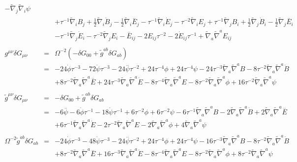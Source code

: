 \documentclass[10pt,letterpaper]{article}
\numberwithin{equation}{section}
\begin{document}
\begin{eqnarray}
-  \tilde{\nabla}_{j}\tilde{\nabla}_{i}\psi
\nonumber\\
&&+\tau^{-1} \tilde{\nabla}_{i}B_{j}
+ \tfrac{1}{2} \tilde{\nabla}_{i}\dot{B}_{j}
-  \tfrac{1}{2} \tilde{\nabla}_{i}\overset{..}{E}_{j}
-  \tau^{-1} \tilde{\nabla}_{i}\dot{E}_{j}
-  \tau^{-2} \tilde{\nabla}_{i}E_{j}
+ \tau^{-1} \tilde{\nabla}_{j}B_{i}
+ \tfrac{1}{2} \tilde{\nabla}_{j}\dot{B}_{i}
-  \tfrac{1}{2} \tilde{\nabla}_{j}\overset{..}{E}_{i}\nonumber\\
&& -  \tau^{-1} \tilde{\nabla}_{j}\dot{E}_{i}
-  \tau^{-2} \tilde{\nabla}_{j}E_{i}
- \overset{..}{E}_{ij}
- 2 E_{ij} \tau^{-2}
- 2 \dot{E}_{ij} \tau^{-1}
+ \tilde{\nabla}_{a}\tilde{\nabla}^{a}E_{ij}
\\ \nonumber\\
g^{\mu\nu}\delta G_{\mu\nu}&=& \Omega^{-2}(-\delta G_{00} + \tilde g^{ab}\delta G_{ab})
\nonumber\\
&=& -24 \dot{\phi} \tau^{-3}
- 72 \dot{\psi} \tau^{-3}
- 24 \overset{..}{\psi} \tau^{-2}
+ 24 \tau^{-4} \phi
+ 24 \tau^{-4} \psi
- 24 \tau^{-3} \tilde{\nabla}_{a}\tilde{\nabla}^{a}B
- 8 \tau^{-2} \tilde{\nabla}_{a}\tilde{\nabla}^{a}\dot{B}\nonumber\\
&& + 8 \tau^{-2} \tilde{\nabla}_{a}\tilde{\nabla}^{a}\overset{..}{E}
+ 24 \tau^{-3} \tilde{\nabla}_{a}\tilde{\nabla}^{a}\dot{E}
- 8 \tau^{-4} \tilde{\nabla}_{a}\tilde{\nabla}^{a}E
- 8 \tau^{-2} \tilde{\nabla}_{a}\tilde{\nabla}^{a}\phi
+ 16 \tau^{-2} \tilde{\nabla}_{a}\tilde{\nabla}^{a}\psi
\\ \nonumber\\
\tilde g^{\mu\nu}\delta G_{\mu\nu}&=& -\delta G_{00} + \tilde g^{ab}\delta G_{ab}
\nonumber\\
&=&-6 \overset{..}{\psi}
- 6 \dot{\phi} \tau^{-1}
- 18 \dot{\psi} \tau^{-1}
+ 6 \tau^{-2} \phi
+ 6 \tau^{-2} \psi
- 6 \tau^{-1} \tilde{\nabla}_{a}\tilde{\nabla}^{a}B
- 2 \tilde{\nabla}_{a}\tilde{\nabla}^{a}\dot{B}
+ 2 \tilde{\nabla}_{a}\tilde{\nabla}^{a}\overset{..}{E}\nonumber\\
&& + 6 \tau^{-1} \tilde{\nabla}_{a}\tilde{\nabla}^{a}\dot{E}
- 2 \tau^{-2} \tilde{\nabla}_{a}\tilde{\nabla}^{a}E
- 2 \tilde{\nabla}_{a}\tilde{\nabla}^{a}\phi
+ 4 \tilde{\nabla}_{a}\tilde{\nabla}^{a}\psi 
\\ \nonumber\\
\Omega^{-2}\tilde g^{ab}\delta G_{ab} &=&
-24 \dot{\phi} \tau^{-3}
- 48 \dot{\psi} \tau^{-3}
- 24 \overset{..}{\psi} \tau^{-2}
+ 24 \tau^{-4} \phi
+ 24 \tau^{-4} \psi
- 16 \tau^{-3} \tilde{\nabla}_{a}\tilde{\nabla}^{a}B
- 8 \tau^{-2} \tilde{\nabla}_{a}\tilde{\nabla}^{a}\dot{B}
\nonumber\\
&& + 8 \tau^{-2} \tilde{\nabla}_{a}\tilde{\nabla}^{a}\overset{..}{E}
+ 16 \tau^{-3} \tilde{\nabla}_{a}\tilde{\nabla}^{a}\dot{E}
- 8 \tau^{-4} \tilde{\nabla}_{a}\tilde{\nabla}^{a}E
- 8 \tau^{-2} \tilde{\nabla}_{a}\tilde{\nabla}^{a}\phi
+ 8 \tau^{-2} \tilde{\nabla}_{a}\tilde{\nabla}^{a}\psi 
\end{eqnarray}
\end{document}
